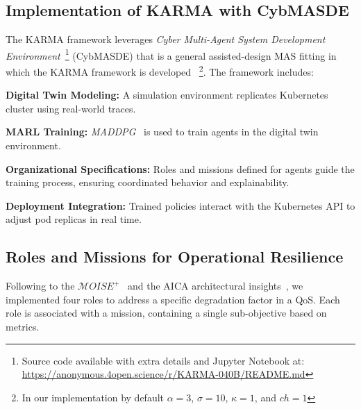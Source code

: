 \documentclass[conference]{IEEEtran}
\begin{document}
\subsection{Implementation of KARMA with CybMASDE}


The KARMA framework leverages \textit{Cyber Multi-Agent System Development Environment}~\footnote{Source code available with extra details and Jupyter Notebook at: \url{https://anonymous.4open.science/r/KARMA-040B/README.md}} (CybMASDE) that is a general assisted-design MAS fitting in which the KARMA framework is developed
~\footnote{In our implementation by default $\alpha = 3$, $\sigma = 10$, $\kappa = 1$, and $ch = 1$}.
The framework includes:
\begin{enumerate*}[label=\textbf{\arabic*)}, itemjoin={;\quad }]
    \item \textbf{Digital Twin Modeling:} A simulation environment replicates Kubernetes cluster using real-world traces.
    \item \textbf{MARL Training:} \textit{MADDPG}~\cite{Lowe2017MADDPG} is used to train agents in the digital twin environment.
    \item \textbf{Organizational Specifications:} Roles and missions defined for agents guide the training process, ensuring coordinated behavior and explainability.
    \item \textbf{Deployment Integration:} Trained policies interact with the Kubernetes API to adjust pod replicas in real time.
\end{enumerate*}

\subsection{Roles and Missions for Operational Resilience}

\noindent Following to the $\mathcal{M}OISE^+$~\cite{hubner2002moise} and the AICA architectural insights~\cite{kott2018autonomous}, we implemented four roles to address a specific degradation factor in a QoS.
Each role is associated with a mission, containing a single sub-objective based on metrics.
\end{document}
